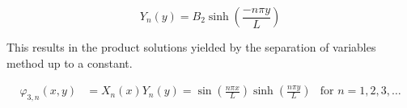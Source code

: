 \begin{equation}\label{eq:ivpYSol}
Y _ { n } \left( y \right) =  B _ { 2 } \sinh \left(\frac{ - n \pi y }{ L }\right)
\end{equation}

This results in the product solutions yielded by the separation of variables method up to a constant.

\begin{equation}\label{eq:sovSol}
\begin{aligned} 
\varphi _ { 3 , n } \left( x , y \right) & = X _ { n } \left( x \right) Y _ { n } \left( y \right) 
= \sin \left( \frac { n \pi x } { L } \right) \sinh \left(\frac { n \pi y } { L } \right)
& \text{for } n=1,2,3,\dots
\end{aligned}
\end{equation}